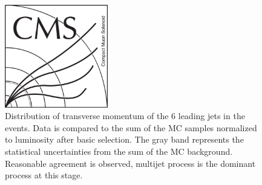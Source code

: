 \begin{figure}[!Hhtbp]
\begin{center}
    \includegraphics[width=0.4\textwidth]{figs/CMSlogo.png}
    \caption{Distribution of transverse momentum of the 6
      leading jets in the events. Data is compared to the sum of the
      MC samples normalized to luminosity after basic selection. The gray band represents the statistical
      uncertainties from the sum of the MC background. Reasonable agreement is observed, multijet process is the dominant process at this stage.}
    \label{fig:6jpt}
  \end{center}
\end{figure}\clearpage

